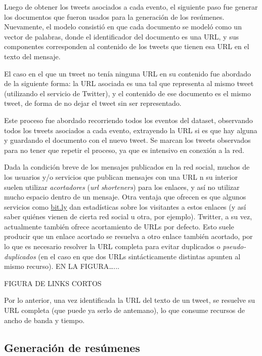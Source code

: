     Luego de obtener los tweets asociados a cada evento, el siguiente
    paso fue generar los documentos que fueron usados para la
    generación de los resúmenes. Nuevamente, el modelo consistió en que cada
    documento se modeló como un vector de palabras, donde el
    identificador del documento es una URL, y sus componentes
    corresponden al contenido de los tweets que tienen esa URL en el
    texto del mensaje.

    El caso en el que un tweet no tenía ninguna URL en su contenido
    fue abordado de la siguiente forma: la URL asociada es una tal que
    representa al mismo tweet (utilizando el servicio de Twitter), y
    el contenido de ese documento es el mismo tweet, de forma de no
    dejar el tweet sin ser representado.

    Este proceso fue abordado recorriendo todos los eventos del
    dataset, observando todos los tweets asociados a cada evento,
    extrayendo la URL si es que hay alguna y guardando el documento
    con el nuevo tweet. Se marcan los tweets observados para no tener
    que repetir el proceso, ya que es intensivo en conexión a la red.

    Dada la condición breve de los mensajes publicados en la red
    social, muchos de los usuarios y/o servicios que publican mensajes
    con una URL n su interior suelen utilizar \emph{acortadores} (\emph{url shorteners})
    para los enlaces, y así no utilizar mucho espacio dentro de un
    mensaje. Otra ventaja que ofrecen es que algunos servicios como
    \hyperref[sec-1.2.1]{bit.ly} dan estadísticas sobre los visitantes a estos enlaces (y
    así saber quiénes vienen de cierta red social u otra, por
    ejemplo). Twitter, a su vez, actualmente también ofrece
    acortamiento de URLs por defecto. Esto suele producir que un enlace
    acortado se resuelva a otro enlace también acortado, por lo que es
    necesario resolver la URL completa para evitar duplicados o
    \emph{pseudo-duplicados} (en el caso en que dos URLs sintácticamente
    distintas apunten al mismo recurso). EN LA FIGURA\ldots{}...

    FIGURA DE LINKS CORTOS

    Por lo anterior, una vez identificada la URL del texto de un
    tweet, se resuelve su URL completa (que puede ya serlo de
    antemano), lo que consume recursos de ancho de banda y
    tiempo.


\subsection{Generación de resúmenes}
\label{sec-1.2.2}



